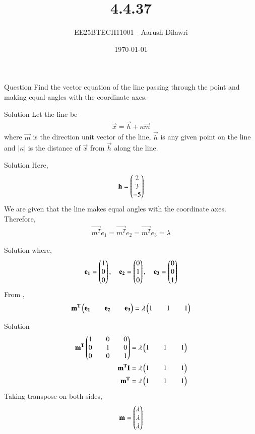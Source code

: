 \documentclass{beamer}
\title{4.4.37}
\date{\today}
\author{EE25BTECH11001 - Aarush Dilawri}
\begin{document}
\frame{\titlepage}


\begin{frame}{Question}
Find the vector equation of the line passing through the point  and making equal angles with the coordinate axes.
\end{frame}

\begin{frame}{Solution}
Let the line be
\begin{align}
    \vec{x} = \vec{h} + \kappa\vec{m}
\end{align}
where $\vec{m}$ is the direction unit vector of the line, $\vec{h}$ is any given point on the line and $\lvert \kappa \rvert$ is the distance of $\vec{x}$ from $\vec{h}$ along the line.
\end{frame}

\begin{frame}{Solution}
Here,
\begin{align}
    \mathbf{h} = \begin{pmatrix}2 \\ 3 \\ -5\end{pmatrix}
\end{align}
We are given that the line makes equal angles with the coordinate axes. Therefore,
\begin{align}
    \vec{m^T}e_1 = \vec{m^T}e_2 = \vec{m^T}e_3 = \lambda
\end{align}
\end{frame}

\begin{frame}{Solution}
where,
\begin{align}
    \mathbf{e_1} = \begin{pmatrix}1 \\ 0 \\ 0\end{pmatrix}, \quad
    \mathbf{e_2} = \begin{pmatrix}0 \\ 1 \\ 0\end{pmatrix}, \quad
    \mathbf{e_3} = \begin{pmatrix}0 \\ 0 \\ 1\end{pmatrix}
\end{align}
From ,
\begin{align}
    \mathbf{m^T}\begin{pmatrix}\mathbf{e_1} && \mathbf{e_2} && \mathbf{e_3}\end{pmatrix} = \lambda\begin{pmatrix}1 && 1 && 1\end{pmatrix}
\end{align}
\end{frame}

\begin{frame}{Solution}
\begin{align}
    \mathbf{m^T}\begin{pmatrix}1 && 0 && 0 \\ 0 && 1 && 0 \\ 0 && 0 && 1\end{pmatrix} = \lambda\begin{pmatrix}1 && 1 && 1\end{pmatrix}\\
    \mathbf{m^T}\mathbf{I} = \lambda\begin{pmatrix}1 && 1 && 1\end{pmatrix}\\
    \mathbf{m^T} = \lambda\begin{pmatrix}1 && 1 && 1\end{pmatrix}
\end{align}
Taking transpose on both sides,
\begin{align}
    \mathbf{m} = \begin{pmatrix}\lambda \\ \lambda \\ \lambda\end{pmatrix}
\end{align}
\end{frame}
\end{document}
